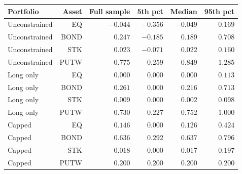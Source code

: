 \begin{tabular}{lrrrrr}
\toprule
Portfolio & Asset & Full sample & 5th pct & Median & 95th pct \\
\midrule
Unconstrained & EQ & $-0.044$ & $-0.356$ & $-0.049$ & $0.169$ \\
Unconstrained & BOND & $0.247$ & $-0.185$ & $0.189$ & $0.708$ \\
Unconstrained & STK & $0.023$ & $-0.071$ & $0.022$ & $0.160$ \\
Unconstrained & PUTW & $0.775$ & $0.259$ & $0.849$ & $1.285$ \\
Long only & EQ & $0.000$ & $0.000$ & $0.000$ & $0.113$ \\
Long only & BOND & $0.261$ & $0.000$ & $0.216$ & $0.713$ \\
Long only & STK & $0.009$ & $0.000$ & $0.002$ & $0.098$ \\
Long only & PUTW & $0.730$ & $0.227$ & $0.752$ & $1.000$ \\
Capped & EQ & $0.146$ & $0.000$ & $0.126$ & $0.424$ \\
Capped & BOND & $0.636$ & $0.292$ & $0.637$ & $0.796$ \\
Capped & STK & $0.018$ & $0.000$ & $0.017$ & $0.197$ \\
Capped & PUTW & $0.200$ & $0.200$ & $0.200$ & $0.200$ \\
\bottomrule
\end{tabular}

